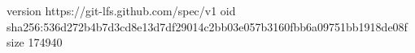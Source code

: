 version https://git-lfs.github.com/spec/v1
oid sha256:536d272b4b7d3cd8e13d7df29014c2bb03e057b3160fbb6a09751bb1918de08f
size 174940

